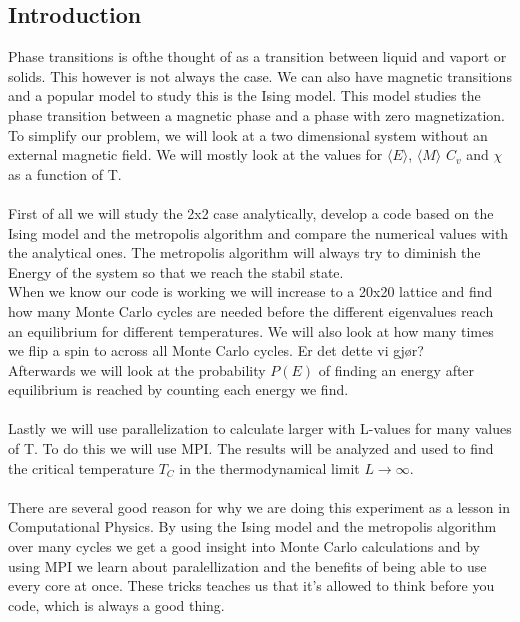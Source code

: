 \documentclass{article}
\newcommand{\husk}[1]{\color{red} #1 \color{black}}
\begin{document}
\subsection*{Introduction}
Phase transitions is ofthe thought of as a transition between liquid and vaport or solids. This however is not always the case. We can also have magnetic transitions and a popular model to study this is the Ising model. This model studies the phase transition between a magnetic phase and a phase with zero magnetization. To simplify our problem, we will look at a two dimensional system without an external magnetic field. We will mostly look at the values for $\langle E \rangle$, $\langle M \rangle$ $C_v$ and $\chi$ as a function of T.\\ \\
First of all we will study the 2x2 case analytically, develop a code based on the Ising model and the metropolis algorithm and compare the numerical values with the analytical ones. The metropolis algorithm will always try to diminish the Energy of the system so that we reach the stabil state.\\
When we know our code is working we will increase to a 20x20 lattice and find how many Monte Carlo cycles are needed before the different eigenvalues reach an equilibrium for different temperatures. We will also look at how many times we flip a spin to across all Monte Carlo cycles. \husk{Er det dette vi gjør?} \\
Afterwards we will look at the probability $P(E)$ of finding an energy after equilibrium is reached by counting each energy we find. \\ \\
Lastly we will use parallelization to calculate larger with L-values for many values of T. To do this we will use MPI. The results will be analyzed and used to find the critical temperature $T_C$ in the thermodynamical limit $L \rightarrow \infty$. \\ \\
There are several good reason for why we are doing this experiment as a lesson in Computational Physics. By using the Ising model and the metropolis algorithm over many cycles we get a good insight into Monte Carlo calculations and by using MPI we learn about paralellization and the benefits of being able to use every core at once. These tricks teaches us that it's allowed to think before you code, which is always a good thing.
\end{document}
